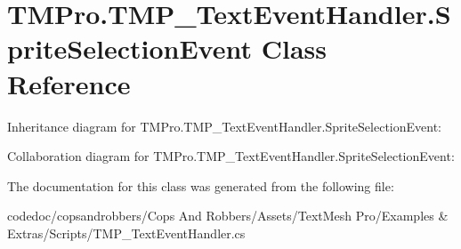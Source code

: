 \hypertarget{classTMPro_1_1TMP__TextEventHandler_1_1SpriteSelectionEvent}{}\section{T\+M\+Pro.\+T\+M\+P\+\_\+\+Text\+Event\+Handler.\+Sprite\+Selection\+Event Class Reference}
\label{classTMPro_1_1TMP__TextEventHandler_1_1SpriteSelectionEvent}


Inheritance diagram for T\+M\+Pro.\+T\+M\+P\+\_\+\+Text\+Event\+Handler.\+Sprite\+Selection\+Event\+:


Collaboration diagram for T\+M\+Pro.\+T\+M\+P\+\_\+\+Text\+Event\+Handler.\+Sprite\+Selection\+Event\+:


The documentation for this class was generated from the following file\+:\begin{DoxyCompactItemize}
\item 
codedoc/copsandrobbers/\+Cops And Robbers/\+Assets/\+Text\+Mesh Pro/\+Examples \& Extras/\+Scripts/T\+M\+P\+\_\+\+Text\+Event\+Handler.\+cs\end{DoxyCompactItemize}
